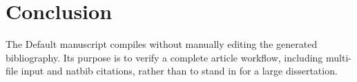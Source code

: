 \section{Conclusion}
The Default manuscript compiles without manually editing the generated bibliography.
Its purpose is to verify a complete article workflow, including multi-file input
and natbib citations, rather than to stand in for a large dissertation.
